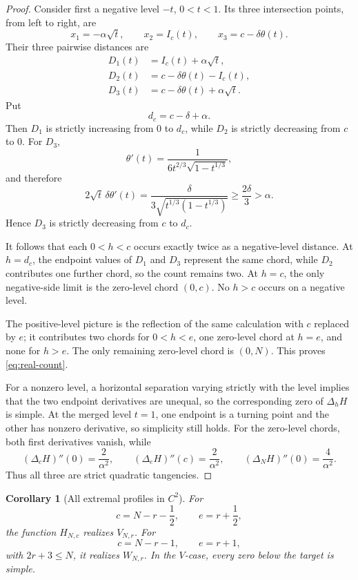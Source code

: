 \documentclass[11pt]{article}
\newtheorem{corollary}[theorem]{Corollary}
\theoremstyle{definition}
\theoremstyle{remark}
\begin{document}
\begin{proof}
Consider first a negative level \(-t\), \(0<t<1\).  Its three intersection
points, from left to right, are
\[
x_1=-\alpha\sqrt t,\qquad
x_2=I_c(t),\qquad
x_3=c-\delta\theta(t).
\]
Their three pairwise distances are
\begin{align*}
D_1(t)&=I_c(t)+\alpha\sqrt t,\\
D_2(t)&=c-\delta\theta(t)-I_c(t),\\
D_3(t)&=c-\delta\theta(t)+\alpha\sqrt t.
\end{align*}
Put
\[
d_c=c-\delta+\alpha.
\]
Then \(D_1\) is strictly increasing from \(0\) to \(d_c\), while
\(D_2\) is strictly decreasing from \(c\) to \(0\).
For \(D_3\),
\[
\theta'(t)
=
\frac{1}{6t^{2/3}\sqrt{1-t^{1/3}}},
\]
and therefore
\[
2\sqrt t\,\delta\theta'(t)
=
\frac{\delta}
{3\sqrt{t^{1/3}(1-t^{1/3})}}
\ge\frac{2\delta}{3}
>\alpha.
\]
Hence \(D_3\) is strictly decreasing from \(c\) to \(d_c\).

It follows that each \(0<h<c\) occurs exactly twice as a negative-level
distance.  At \(h=d_c\), the endpoint values of \(D_1\) and \(D_3\)
represent the same chord, while \(D_2\) contributes one further chord,
so the count remains two.  At \(h=c\), the only negative-side limit is
the zero-level chord \((0,c)\).  No \(h>c\) occurs on a negative level.

The positive-level picture is the reflection of the same calculation
with \(c\) replaced by \(e\); it contributes two chords for \(0<h<e\),
one zero-level chord at \(h=e\), and none for \(h>e\).  The only
remaining zero-level chord is \((0,N)\).  This proves
\eqref{eq:real-count}.

For a nonzero level, a horizontal separation varying strictly with the
level implies that the two endpoint derivatives are unequal, so the
corresponding zero of \(\Delta_hH\) is simple.  At the merged level
\(t=1\), one endpoint is a turning point and the other has nonzero
derivative, so simplicity still holds.  For the zero-level chords,
both first derivatives vanish, while
\[
(\Delta_cH)''(0)=\frac2{\alpha^2},\qquad
(\Delta_eH)''(c)=\frac2{\alpha^2},\qquad
(\Delta_NH)''(0)=\frac4{\alpha^2}.
\]
Thus all three are strict quadratic tangencies.
\end{proof}

\begin{corollary}[All extremal profiles in \(C^2\)]\label{cor:C2-realize}
For
\[
c=N-r-\frac12,\qquad e=r+\frac12,
\]
the function \(H_{N,c}\) realizes \(V_{N,r}\).
For
\[
c=N-r-1,\qquad e=r+1,
\]
with \(2r+3\le N\), it realizes \(W_{N,r}\).
In the \(V\)-case, every zero below the target is simple.
\end{corollary}
\end{document}
